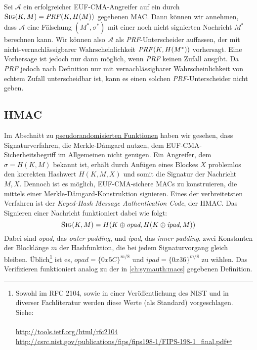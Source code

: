 \begin{beweis}[Entwurf] Sei $\mathcal{A}$ ein erfolgreicher
  EUF-CMA-Angreifer auf ein durch $\textsc{Sig}(K,M) =
  \text{\textit{PRF}}(K,H(M))$ gegebenen MAC. Dann können wir annehmen,
  dass $\mathcal{A}$ eine Fälschung $(M^*,\sigma^*)$ mit einer noch nicht
  signierten Nachricht $M^*$ berechnen kann. Wir können also $\mathcal{A}$
  als \textit{PRF}-Unterscheider auffassen, der mit
  nicht-vernachlässigbarer Wahrscheinlichkeit
  $\text{\textit{PRF}}(K,H(M^*))$ vorhersagt. Eine Vorhersage ist jedoch
  nur dann möglich, wenn \textit{PRF} keinen Zufall ausgibt. Da
  \textit{PRF} jedoch nach Definition nur mit vernachlässigbarer
  Wahrscheinlichkeit von echtem Zufall unterscheidbar ist, kann es einen
  solchen \textit{PRF}-Unterscheider nicht geben.
\end{beweis}

\subsection{HMAC} Im Abschnitt zu
\hyperref[ssec:prf]{pseudorandomisierten Funktionen} haben wir gesehen,
dass Signaturverfahren, die Merkle-Dåmgard nutzen, dem
EUF-CMA-Sicherheitsbegriff im Allgemeinen nicht genügen. Ein Angreifer,
dem $\sigma = H(K,M)$ bekannt ist, erhält durch Anfügen eines Blockes
$X$ problemlos den korrekten Hashwert $H(K,M,X)$ und somit die Signatur
der Nachricht $M,X$.  Dennoch ist es möglich, EUF-CMA-sichere MACs zu
konstruieren, die mittels einer Merkle-Dåmgard-Konstruktion signieren.
Eines der verbreitetsten Verfahren ist der \textit{Keyed-Hash Message
  Authentication Code}, der HMAC. Das Signieren einer Nachricht
funktioniert dabei wie folgt:
\begin{equation*}
  \textsc{Sig}(K,M) = H(K \oplus \textit{opad}, H(K \oplus
  \textit{ipad}, M))
\end{equation*} 
Dabei sind \textit{opad}, das \textit{outer padding},
und \textit{ipad}, das \textit{inner padding}, zwei Konstanten der
Blocklänge $m$ der Hashfunktion, die bei jedem Signaturvorgang gleich
bleiben. Üblich\footnote{Sowohl im RFC 2104, sowie in einer
  Veröffentlichung des NIST und in diverser Fachliteratur werden diese
  Werte (als Standard) vorgeschlagen. Siehe: ~\\~\\
  \url{http://tools.ietf.org/html/rfc2104} \\
  \url{http://csrc.nist.gov/publications/fips/fips198-1/FIPS-198-1_final.pdf}}
ist es, $opad = \{0x5C\}^{m/8}$ und $ipad = \{0x36\}^{m/8}$ zu
wählen. Das Verifizieren funktioniert analog zu der in
\ref{ch:symauth:macs} gegebenen Definition.

